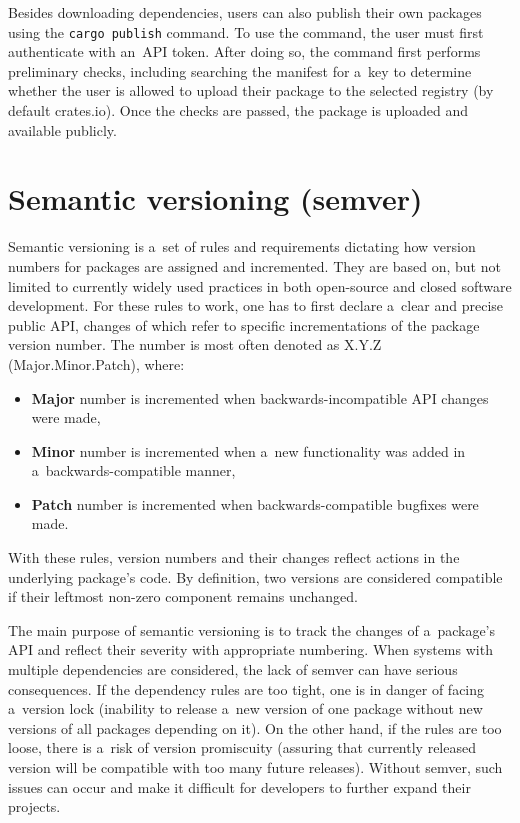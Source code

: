 \documentclass[licencjacka,en]{pracamgr}
\begin{document}
Besides downloading dependencies, users can also publish their own packages using
the \texttt{cargo publish} command. To use the command, the user must first authenticate with
an~API token. After doing so, the command first performs preliminary checks, including searching
the manifest for a~key to determine whether the user is allowed to upload their package
to the selected registry (by default crates.io). Once the checks are passed, the package is
uploaded and available publicly.

\section{Semantic versioning (semver)}\label{r:section_semver}

Semantic versioning is a~set of rules and requirements dictating how version numbers for packages
are assigned and incremented. They are based on, but not limited to currently widely used
practices in both open-source and closed software development. For these rules to work, one has to
first declare a~clear and precise public API, changes of which refer to specific incrementations of
the package version number. The number is most often denoted as X.Y.Z (Major.Minor.Patch), where:
\begin{itemize}
	\item \textbf{Major} number is incremented when backwards-incompatible API changes were made,
	\item \textbf{Minor} number is incremented when a~new functionality was added in
		a~backwards-compatible manner,
	\item \textbf{Patch} number is incremented when backwards-compatible bugfixes were made.
\end{itemize}
With these rules, version numbers and their changes reflect actions in the underlying
package's code. By definition, two versions are considered compatible if their leftmost non-zero
component remains unchanged.

The main purpose of semantic versioning is to track the changes of a~package's API and reflect
their severity with appropriate numbering.
When systems with multiple dependencies are considered, the lack of semver can have serious
consequences. If the dependency rules are too tight, one is in danger of facing a~version lock
(inability to release a~new version of one package without new versions of all packages depending
on it). On the other hand, if the rules are too loose, there is a~risk of version promiscuity
(assuring that currently released version will be compatible with too many future releases).
Without semver, such issues can occur and make it difficult for developers to further expand
their projects.
\end{document}

